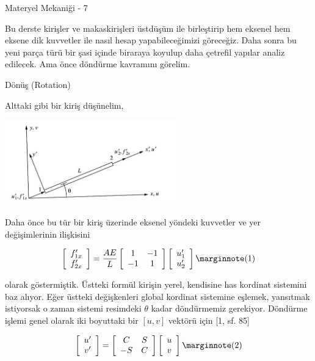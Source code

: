 \documentclass[12pt,fleqn]{article}\usepackage{../../common}
\begin{document}
Materyel Mekaniği - 7

Bu derste kirişler ve makaskirişleri üstdüşüm ile birleştirip hem eksenel hem
eksene dik kuvvetler ile nasıl hesap yapabileceğimizi göreceğiz. Daha sonra bu
yeni parça türü bir şasi içinde biraraya koyulup daha çetrefil yapılar analiz
edilecek. Ama önce döndürme kavramını görelim.

Dönüş (Rotation)

Alttaki gibi bir kiriş düşünelim,

\includegraphics[width=20em]{phy_020_strs_06_01.jpg}

Daha önce bu tür bir kiriş üzerinde eksenel yöndeki kuvvetler ve yer
değişimlerinin ilişkisini

$$
\left[\begin{array}{c}
f'_{1x} \\ f'_{2x}
\end{array}\right] =
\frac{AE}{L}
\left[\begin{array}{cc}
1 & -1 \\ -1 & 1
\end{array}\right]
\left[\begin{array}{c}
u'_1 \\ u'_2
\end{array}\right]
\mlabel{1}
$$

olarak göstermiştik. Üstteki formül kirişin yerel, kendisine has kordinat
sistemini baz alıyor. Eğer üstteki değişkenleri global kordinat sistemine
eşlemek, yansıtmak istiyorsak o zaman sistemi resimdeki $\theta$ kadar döndürmemiz
gerekiyor. Döndürme işlemi genel olarak iki boyuttaki bir $[u, v]$ vektörü için
[1, sf. 85]

$$
\left[\begin{array}{c}
u' \\ v'
\end{array}\right] =
\left[\begin{array}{cc}
C & S \\ -S & C
\end{array}\right]
\left[\begin{array}{c}
u \\ v
\end{array}\right]
\mlabel{2}
$$
\end{document}
